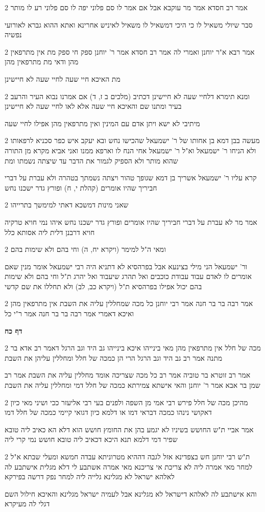 \documentclass[12pt, openany]{book}
\newcommand{\sethebfont}{
\fontsize{10.5pt}{21.0pt} \selectfont
}
\newcommand{\twocol}[1]{
	{\sethebfont \begin{multicols}{2}
			#1
	\end{multicols}}	
}
\newcommand{\sectname}{}
\newcommand{\newsection}[1]{
	\addcontentsline{toc}{section}{#1}
	\renewcommand{\sectname}{#1}	
	\vspace{-\baselineskip}
	\begin{center}
		\textbf{%
\fontsize{16pt}{16pt}\selectfont
			#1}
	\end{center}
	\vspace{-\baselineskip}
	\nopagebreak
}
\begin{document}
\twocol{אמר רב חסדא אמר מר עוקבא אבל אם אמר לו סם פלוני יפה לו סם פלוני רע לו מותר
\par סבר שיולי משאיל לו כי היכי דמשאיל לו משאיל לאיניש אחרינא ואתא ההוא גברא לאורועי נפשיה}
\twocol{אמר רבא א"ר יוחנן ואמרי לה אמר רב חסדא אמר ר' יוחנן ספק חי ספק מת אין מתרפאין מהן ודאי מת מתרפאין מהן
\par מת האיכא חיי שעה לחיי שעה לא חיישינן}
\twocol{ומנא תימרא דלחיי שעה לא חיישינן דכתיב (מלכים ב ז, ד) אם אמרנו נבוא העיר והרעב בעיר ומתנו שם והאיכא חיי שעה אלא לאו לחיי שעה לא חיישינן
\par מיתיבי לא ישא ויתן אדם עם המינין ואין מתרפאין מהן אפילו לחיי שעה}
\twocol{מעשה בבן דמא בן אחותו של ר' ישמעאל שהכישו נחש ובא יעקב איש כפר סכניא לרפאותו ולא הניחו ר' ישמעאל וא"ל ר' ישמעאל אחי הנח לו וארפא ממנו ואני אביא מקרא מן התורה שהוא מותר ולא הספיק לגמור את הדבר עד שיצתה נשמתו ומת
\par קרא עליו ר' ישמעאל אשריך בן דמא שגופך טהור ויצתה נשמתך בטהרה ולא עברת על דברי חביריך שהיו אומרים (קהלת י, ח) ופורץ גדר ישכנו נחש}
\twocol{שאני מינות דמשכא דאתי למימשך בתרייהו
\par אמר מר לא עברת על דברי חביריך שהיו אומרים ופורץ גדר ישכנו נחש איהו נמי חויא טרקיה חויא דרבנן דלית ליה אסותא כלל}
\twocol{ומאי ה"ל למימר (ויקרא יח, ה) וחי בהם ולא שימות בהם
\par ור' ישמעאל הני מילי בצינעא אבל בפרהסיא לא דתניא היה רבי ישמעאל אומר מנין שאם אומרים לו לאדם עבוד עבודת כוכבים ואל תהרג שיעבוד ואל יהרג ת"ל וחי בהם ולא שימות בהם יכול אפילו בפרהסיא ת"ל (ויקרא כב, לב) ולא תחללו את שם קדשי}
\twocol{אמר רבה בר בר חנה אמר רבי יוחנן כל מכה שמחללין עליה את השבת אין מתרפאין מהן ואיכא דאמרי אמר רבה בר בר חנה אמר ר"י כל}
\newsection{דף כח}
\twocol{מכה של חלל אין מתרפאין מהן מאי בינייהו איכא בינייהו גב היד וגב הרגל דאמר רב אדא בר מתנה אמר רב גב היד וגב הרגל הרי הן כמכה של חלל ומחללין עליהן את השבת
\par אמר רב זוטרא בר טוביה אמר רב כל מכה שצריכה אומד מחללין עליה את השבת אמר רב שמן בר אבא אמר ר' יוחנן והאי אישתא צמירתא כמכה של חלל דמי ומחללין עליה את השבת}
\twocol{מהיכן מכה של חלל פירש רבי אמי מן השפה ולפנים בעי רבי אליעזר ככי ושיני מאי כיון דאקושי נינהו כמכה דבראי דמו או דלמא כיון דגואי קיימי כמכה של חלל דמו
\par אמר אביי ת"ש החושש בשיניו לא יגמע בהן את החומץ חושש הוא דלא הא כאיב ליה טובא שפיר דמי דלמא תנא היכא דכאיב ליה טובא חושש נמי קרי ליה}
\twocol{ת"ש רבי יוחנן חש בצפדינא אזל לגבה דההיא מטרוניתא עבדה חמשא ומעלי שבתא א"ל למחר מאי אמרה ליה לא צריכת אי צריכנא מאי אמרה אשתבע לי דלא מגלית אישתבע לה לאלהא ישראל לא מגלינא גלייה ליה למחר נפק דרשה בפירקא
\par והא אישתבע לה לאלהא דישראל לא מגלינא אבל לעמיה ישראל מגלינא והאיכא חילול השם דגלי לה מעיקרא}
\end{document}
